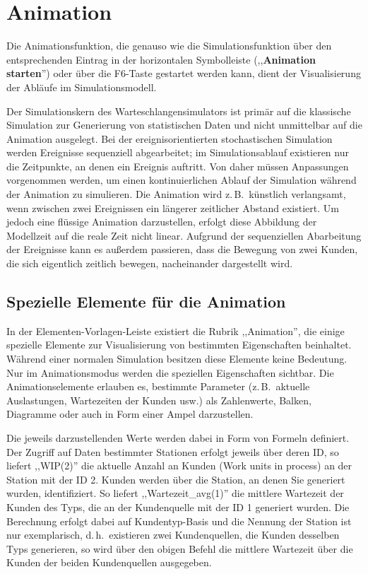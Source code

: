 \documentclass[deutsch]{svmono}
\begin{document}
\chapter{Animation}

Die Animationsfunktion, die genauso wie die Simulationsfunktion über den entsprechenden Eintrag in der horizontalen Symbolleiste (,,\textbf{Animation starten}'') oder über die F6-Taste gestartet werden kann, dient der Visualisierung der Abläufe im Simulationsmodell.

Der Simulationskern des Warteschlangensimulators ist primär auf die klassische Simulation zur Generierung von statistischen Daten und nicht unmittelbar auf die Animation ausgelegt. Bei der ereignisorientierten stochastischen Simulation werden Ereignisse sequenziell abgearbeitet; im Simulationsablauf existieren nur die Zeitpunkte, an denen ein Ereignis auftritt. Von daher müssen Anpassungen vorgenommen werden, um einen kontinuierlichen Ablauf der Simulation während der Animation zu simulieren. Die Animation wird z.\,B.\ künstlich verlangsamt, wenn zwischen zwei Ereignissen ein längerer zeitlicher Abstand existiert. Um jedoch eine flüssige Animation darzustellen, erfolgt diese Abbildung der Modellzeit auf die reale Zeit nicht linear. Aufgrund der sequenziellen Abarbeitung der Ereignisse kann es außerdem passieren, dass die Bewegung von zwei Kunden, die sich eigentlich zeitlich bewegen, nacheinander dargestellt wird.

\section{Spezielle Elemente für die Animation}

In der Elementen-Vorlagen-Leiste existiert die Rubrik ,,Animation'', die einige spezielle Elemente zur Visualisierung von bestimmten Eigenschaften beinhaltet. Während einer normalen Simulation besitzen diese Elemente keine Bedeutung. Nur im Animationsmodus werden die speziellen Eigenschaften sichtbar. Die Animationselemente erlauben es, bestimmte Parameter (z.\,B.\ aktuelle Auslastungen, Wartezeiten der Kunden usw.) als Zahlenwerte, Balken, Diagramme oder auch in Form einer Ampel darzustellen.

Die jeweils darzustellenden Werte werden dabei in Form von Formeln definiert. Der Zugriff auf Daten bestimmter Stationen erfolgt jeweils über deren ID, so liefert ,,WIP(2)'' die aktuelle Anzahl an Kunden (Work units in process) an der Station mit der ID 2. Kunden werden über die Station, an denen Sie generiert wurden, identifiziert. So liefert ,,Wartezeit\_avg(1)'' die mittlere Wartezeit der Kunden des Typs, die an der Kundenquelle mit der ID 1 generiert wurden. Die Berechnung erfolgt dabei auf Kundentyp-Basis und die Nennung der Station ist nur exemplarisch, d.\,h.\ existieren zwei Kundenquellen, die Kunden desselben Typs generieren, so wird über den obigen Befehl die mittlere Wartezeit über die Kunden der beiden Kundenquellen ausgegeben.
 
\end{document}
